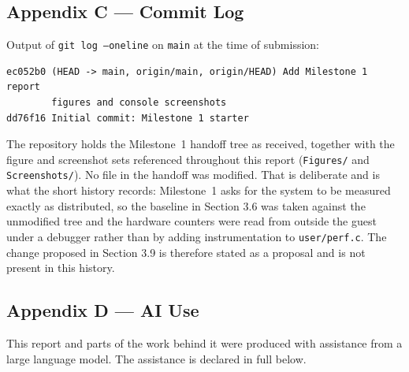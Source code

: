 \documentclass[11pt]{article}
\renewcommand{\_}{\origunderscore\allowbreak}
\begin{document}
\subsection*{Appendix C --- Commit Log}

Output of \texttt{git log --oneline} on \texttt{main} at the time of submission:

\begin{lstlisting}[style=shell]
ec052b0 (HEAD -> main, origin/main, origin/HEAD) Add Milestone 1 report
        figures and console screenshots
dd76f16 Initial commit: Milestone 1 starter
\end{lstlisting}

The repository holds the Milestone~1 handoff tree as received, together with the figure and screenshot sets referenced throughout this report (\texttt{Figures/} and \texttt{Screenshots/}). No file in the handoff was modified. That is deliberate and is what the short history records: Milestone~1 asks for the system to be measured exactly as distributed, so the baseline in Section 3.6 was taken against the unmodified tree and the hardware counters were read from outside the guest under a debugger rather than by adding instrumentation to \texttt{user/perf.c}. The change proposed in Section 3.9 is therefore stated as a proposal and is not present in this history.

\subsection*{Appendix D --- AI Use}

This report and parts of the work behind it were produced with assistance from a large language model. The assistance is declared in full below.
\end{document}
